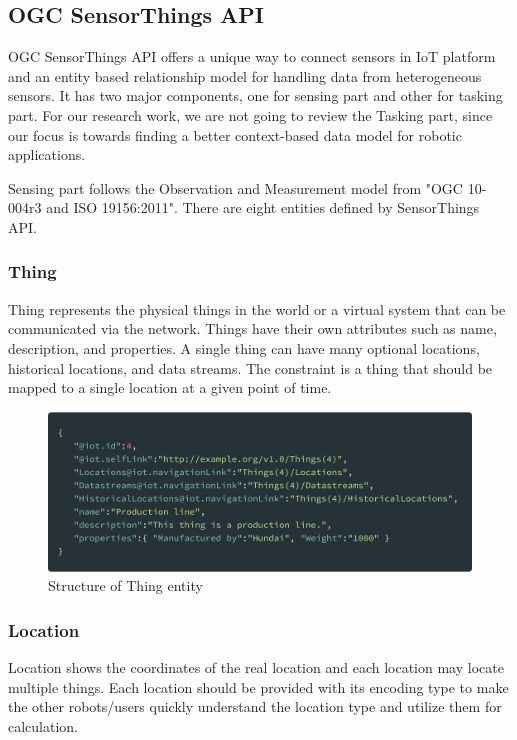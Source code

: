 	\subsection{OGC SensorThings API}
	OGC SensorThings API offers a unique way to connect sensors in IoT platform and an entity based relationship model for handling data from heterogeneous sensors. It has two major components, one for sensing part and other for tasking part. For our research work, we are not going to review the Tasking part, since our focus is towards finding a better context-based data model for robotic applications.
	
	Sensing part follows the Observation and Measurement model from "OGC 10-004r3 and ISO 19156:2011". There are eight entities defined by SensorThings API.
	
	\subsubsection{Thing}
	Thing represents the physical things in the world or a virtual system that can be communicated via the network. Things have their own attributes such as name, description, and properties. A single thing can have many optional locations, historical locations, and data streams. The constraint is a thing that should be mapped to a single location at a given point of time.
	
	\begin{figure}[!htbp] 
		\begin{center}
			\includegraphics[scale=0.1]{./images/png/ogc/thing}	
			\caption{Structure of Thing entity}	
			\label{fig:thing}	
		\end{center}
	\end{figure}

	\subsubsection{Location}
	Location shows the coordinates of the real location and each location may locate multiple things. Each location should be provided with its encoding type to make the other robots/users quickly understand the location type and utilize them for calculation.
	

